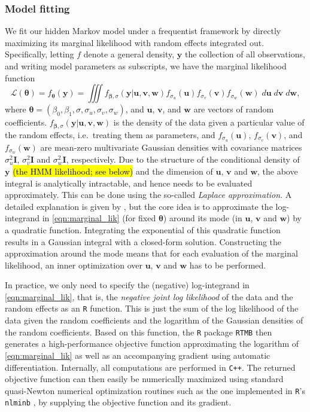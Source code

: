 \documentclass[namedate,webpdf,modern,medium]{oup-authoring-template}
\providecommand{\DIFadd}[1]{\ifmmode{#1}\else\hl{#1}\fi} %
\providecommand{\DIFaddbegin}{} %
\providecommand{\DIFaddend}{} %
\begin{document}
\subsubsection{Model fitting}

We fit our hidden Markov model under a frequentist framework by directly maximizing its marginal likelihood with random effects integrated out. Specifically, letting $f$ denote a general density, $\bm{y}$ the collection of all observations, and writing model parameters as subscripts, we have the marginal likelihood function
\begin{equation}
\label{eqn:marginal_lik}
    \mathcal{L}(\bm{\theta}) = f_{\bm{\theta}}(\bm{y}) = \iiint f_{\bm{\beta}, \sigma}(\bm{y} \vert \bm{u}, \bm{v}, \bm{w}) f_{\sigma_u}(\bm{u}) f_{\sigma_{v}}(\bm{v}) f_{\sigma_{w}}(\bm{w}) \; d\bm{u} \; d\bm{v} \; d\bm{w},
\end{equation}
where $\bm{\theta} = (\beta_0, \beta_1, \sigma, \sigma_u, \sigma_v, \sigma_w)$, and $\bm{u}$, $\bm{v}$, and $\bm{w}$ are vectors of random coefficients. 
$f_{\bm{\beta}, \sigma}(\bm{y} \vert \bm{u}, \bm{v}, \bm{w})$ is the density of the data given a particular value of the random effects, i.e.\ treating them as parameters, and $f_{\sigma_u}(\bm{u})$, $f_{\sigma_{v}}(\bm{v})$, and $f_{\sigma_{w}}(\bm{w})$ are mean-zero multivariate Gaussian densities with covariance matrices $\sigma_u^2 \bm{I}$, $\sigma_v^2 \bm{I}$ and $\sigma_w^2 \bm{I}$, respectively.
Due to the structure of the conditional density of $\bm{y}$ \DIFaddbegin \DIFadd{(the HMM likelihood; see below) }\DIFaddend and the dimension of $\bm{u}$, $\bm{v}$ and $\bm{w}$, the above integral is analytically intractable, and hence needs to be evaluated approximately. This can be done using the so-called \textit{Laplace approximation}. A detailed explanation is given by \citet{kristensen2016tmb}, but the core idea is to approximate the log-integrand in \eqref{eqn:marginal_lik} (for fixed $\bm{\theta}$) around its mode (in $\bm{u}$, $\bm{v}$ and $\bm{w}$) by a quadratic function. Integrating the exponential of this quadratic function results in a Gaussian integral with a closed-form solution. Constructing the approximation around the mode means that for each evaluation of the marginal likelihood, an inner optimization over $\bm{u}$, $\bm{v}$ and $\bm{w}$ has to be performed.

In practice, we only need to specify the (negative) log-integrand in \eqref{eqn:marginal_lik}, that is, the \emph{negative joint log likelihood} of the data and the random effects as an \texttt{R} function. This is just the sum of the log likelihood of the data given the random coefficients and the logarithm of the Gaussian densities of the random coefficients. Based on this function, the \texttt{R} package \texttt{RTMB} \citep{rtmb} then generates a high-performance objective function approximating the logarithm of \eqref{eqn:marginal_lik} as well as an accompanying gradient using automatic differentiation. Internally, all computations are performed in \texttt{C++}. The returned objective function can then easily be numerically maximized using standard quasi-Newton numerical optimization routines such as the one implemented in \texttt{R}'s \texttt{nlminb} \citep{gay1990usage}, by supplying the objective function and its gradient.
\end{document}
